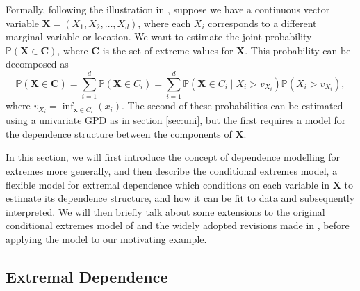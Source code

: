 \documentclass{article}
\numberwithin{equation}{section}
\begin{document}
Formally, following the illustration in \cite{Heffernan2004}, suppose we have a continuous vector variable $\bm{X} = (X_1, X_2, \ldots, X_d)$, where each $X_i$ corresponds to a different marginal variable or location.
We want to estimate the joint probability $\mathbb{P}(\bm{X} \in \bm{C})$, where $\bm{C}$ is the set of extreme values for $\bm{X}$.
This probability can be decomposed as
\begin{equation} \label{eq:decomp}
  \mathbb{P}(\bm{X} \in \bm{C}) = \sum_{i=1}^{d}{\mathbb{P}(\bm{X} \in C_i)} = \sum_{i=1}^{d}{\mathbb{P}(\bm{X} \in C_i \mid X_i > v_{X_i}) \mathbb{P}(X_i > v_{X_i})},
\end{equation}
where $v_{X_i} = \inf_{\bm{x} \in C_i}(x_i)$.
The second of these probabilities can be estimated using a univariate GPD as in section \ref{sec:uni}, but the first requires a model for the dependence structure between the components of $\bm{X}$.

In this section, we will first introduce the concept of dependence modelling for extremes more generally, and then describe the conditional extremes model, a flexible model for extremal dependence which conditions on each variable in $\bm{X}$ to estimate its dependence structure, and how it can be fit to data and subsequently interpreted.
We will then briefly talk about some extensions to the original conditional extremes model of \cite{Heffernan2004} and the widely adopted revisions made in \cite{Keef2013}, before applying the model to our motivating example.

\subsection{Extremal Dependence}
\end{document}
